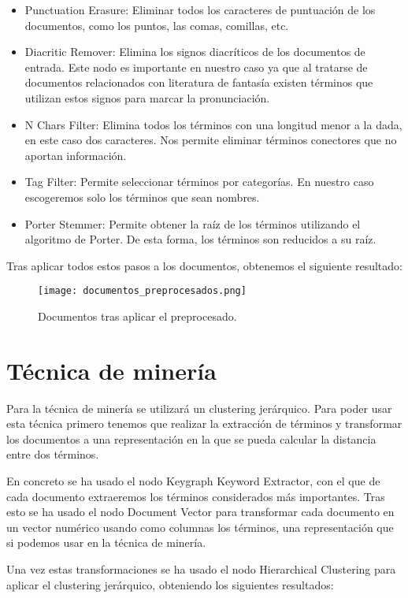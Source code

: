 \begin{itemize}
	\item Punctuation Erasure: Eliminar todos los caracteres de puntuación de los documentos, como los puntos, las comas, comillas, etc.
	\item Diacritic Remover: Elimina los signos diacríticos de los documentos de entrada. Este nodo es importante en nuestro caso ya que al tratarse de documentos relacionados con literatura de fantasía existen términos que utilizan estos signos para marcar la pronunciación.
	\item N Chars Filter: Elimina todos los términos con una longitud menor a la dada, en este caso dos caracteres. Nos permite eliminar términos conectores que no aportan información.
	\item Tag Filter: Permite seleccionar términos por categorías. En nuestro caso escogeremos solo los términos que sean nombres.
	\item Porter Stemmer: Permite obtener la raíz de los términos utilizando el algoritmo de Porter. De esta forma, los términos son reducidos a su raíz.
\end{itemize}

Tras aplicar todos estos pasos a los documentos, obtenemos el siguiente resultado:

\begin{figure}[H]
	\centering
	\texttt{[image: documentos\_preprocesados.png]}
	\caption{Documentos tras aplicar el preprocesado.}
	\label{fig:documentos_preprocesados}
\end{figure}


\section{Técnica de minería}

Para la técnica de minería se utilizará un clustering jerárquico. Para poder usar esta técnica primero tenemos que realizar la extracción de términos y transformar los documentos a una representación en la que se pueda calcular la distancia entre dos términos.

En concreto se ha usado el nodo Keygraph Keyword Extractor, con el que de cada documento extraeremos los términos considerados más importantes. Tras esto se ha usado el nodo Document Vector para transformar cada documento en un vector numérico usando como columnas los términos, una representación que si podemos usar en la técnica de minería.

Una vez estas transformaciones se ha usado el nodo Hierarchical Clustering para aplicar el clustering jerárquico, obteniendo los siguientes resultados:

